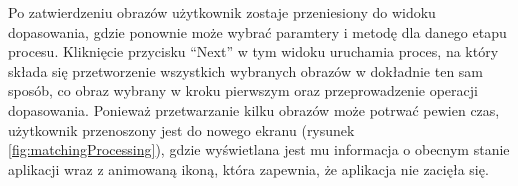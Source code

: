 Po zatwierdzeniu obrazów użytkownik zostaje przeniesiony do widoku dopasowania, gdzie ponownie
może wybra\'c paramtery i metodę dla danego etapu procesu. Kliknięcie przycisku ``Next'' w tym widoku
uruchamia proces, na który składa się przetworzenie wszystkich wybranych obrazów w dokładnie
ten sam sposób, co obraz wybrany w kroku pierwszym oraz przeprowadzenie operacji dopasowania.
Ponieważ przetwarzanie kilku obrazów może potrwa\'c pewien czas, użytkownik przenoszony jest do
nowego ekranu (rysunek \ref{fig:matchingProcessing}), gdzie wyświetlana jest mu informacja o obecnym
stanie aplikacji wraz z animowaną ikoną, która zapewnia, że aplikacja nie zacięła się.
